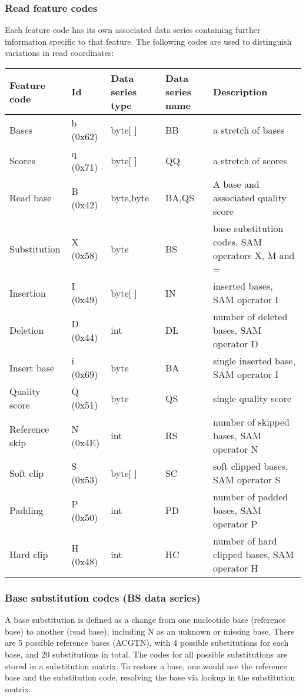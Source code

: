 \documentclass[a4paper]{article}
\begin{document}
\subsubsection*{Read feature codes}

Each feature code has its own associated data series containing further information specific to that feature.
The following codes are used to distinguish variations in read coordinates:

\begin{tabular}{|>{\raggedright}p{91pt}|>{\raggedright}p{45pt}|>{\raggedright}p{72pt}|>{\raggedright}p{66pt}|>{\raggedright}p{132pt}|}
\hline
\textbf{Feature code} & \textbf{Id} & \textbf{Data series type} & \textbf{Data 
series name} & \textbf{Description}\tabularnewline
\hline
Bases & b (0x62) & byte[ ] & BB & a stretch of bases\tabularnewline
\hline
Scores & q (0x71) & byte[ ] & QQ & a stretch of scores\tabularnewline
\hline
%
Read base & B (0x42) & byte,byte & BA,QS & A base and associated quality score\tabularnewline
\hline
Substitution & X (0x58) & byte & BS & base substitution codes, SAM operators X, 
M and =\tabularnewline
\hline
Insertion & I (0x49) & byte[ ] & IN & inserted bases, SAM operator I\tabularnewline
\hline
Deletion & D (0x44) & int & DL & number of deleted bases, SAM operator D\tabularnewline
\hline
Insert base & i (0x69) & byte & BA & single inserted base, SAM operator I\tabularnewline
\hline
Quality score & Q (0x51) & byte & QS & single quality score\tabularnewline
\hline
Reference skip & N (0x4E) & int & RS & number of skipped bases, SAM operator N\tabularnewline
\hline
Soft clip & S (0x53) & byte[ ] & SC & soft clipped bases, SAM operator S\tabularnewline
\hline
Padding & P (0x50) & int & PD & number of padded bases, SAM operator P\tabularnewline
\hline
Hard clip & H (0x48) & int & HC & number of hard clipped bases, SAM operator H\tabularnewline
\hline
\end{tabular}

\subsubsection*{Base substitution codes (BS data series)}

A base substitution is defined as a change from one nucleotide base (reference base) to
another (read base), including N as an unknown or missing base. There are 5 possible reference
bases (ACGTN), with 4 possible substitutions for each base, and 20 substitutions in total.
The codes for all possible substitutions are stored in a substitution matrix. To restore a
base, one would use the reference base and the substitution code, resolving the base via lookup
in the substitution matrix.
\end{document}

